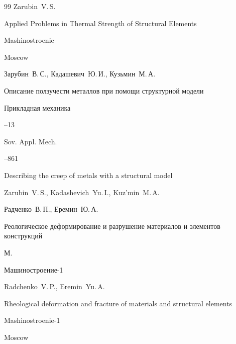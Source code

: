 \begin{thebibliography}{99}
\by Zarubin~V.\,S.

\book Applied Problems in Thermal Strength of Structural Elements 

\publ Mashinostroenie

\publaddr Moscow 






\by Зарубин~В.\,С., Кадашевич~Ю.\,И., Кузьмин~М.\,А.

\paper Описание ползучести металлов при помощи структурной модели

\jour Прикладная механика




--13

\transl 

\jour  Sov. Appl. Mech.




--861

\paper  Describing the creep of metals with a structural model

\by Zarubin~V.\,S., Kadashevich~Yu.\,I., Kuz'min~M.\,A.





\by Радченко~В.\,П., Еремин~Ю.\,А.

\book Реологическое деформирование и разрушение материалов и элементов конструкций

\publaddr М.

\publ Машиностроение-1



\misctransl

\by Radchenko~V.\,P., Eremin~Yu.\,A.

\book Rheological deformation and fracture of materials and structural elements

\publ Mashinostroenie-1

\publaddr Moscow








\end{thebibliography}
